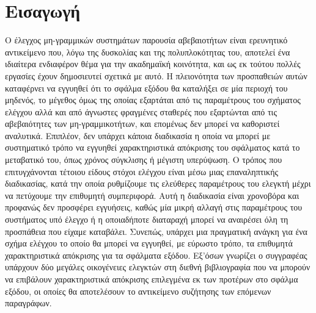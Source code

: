 \chapter{Εισαγωγή}
Ο έλεγχος μη-γραμμικών συστημάτων παρουσία αβεβαιοτήτων είναι ερευνητικό αντικείμενο που, λόγω της δυσκολίας και της πολυπλοκότητας του, αποτελεί ένα ιδιαίτερα ενδιαφέρον θέμα για την ακαδημαϊκή κοινότητα, και ως εκ τούτου πολλές εργασίες έχουν δημοσιευτεί σχετικά με αυτό. H πλειονότητα των προσπαθειών αυτών καταφέρνει να εγγυηθεί ότι το σφάλμα εξόδου θα καταλήξει σε μία περιοχή του μηδενός, το μέγεθος όμως της οποίας εξαρτάται από τις παραμέτρους του σχήματος ελέγχου αλλά και από άγνωστες φραγμένες σταθερές που εξαρτώνται από τις αβεβαιότητες των μη-γραμμικοτήτων, και επομένως δεν μπορεί να καθοριστεί αναλυτικά. Επιπλέον, δεν υπάρχει κάποια διαδικασία η οποία να μπορεί με συστηματικό τρόπο να εγγυηθεί χαρακτηριστικά απόκρισης του σφάλματος κατά το μεταβατικό του, όπως χρόνος σύγκλισης ή μέγιστη υπερύψωση. Ο τρόπος που επιτυγχάνονται τέτοιου είδους στόχοι ελέγχου είναι μέσω μιας επαναληπτικής διαδικασίας, κατά την οποία ρυθμίζουμε τις ελεύθερες παραμέτρους του ελεγκτή μέχρι να πετύχουμε την επιθυμητή συμπεριφορά. Αυτή η διαδικασία είναι χρονοβόρα και προφανώς δεν προσφέρει εγγυήσεις, καθώς μία μικρή αλλαγή στις παραμέτρους του συστήματος υπό έλεγχο ή η οποιαδήποτε διαταραχή μπορεί να αναιρέσει όλη τη προσπάθεια που είχαμε καταβάλει. Συνεπώς, υπάρχει μια πραγματική ανάγκη για ένα σχήμα ελέγχου το οποίο θα μπορεί να εγγυηθεί, με εύρωστο τρόπο, τα επιθυμητά χαρακτηριστικά απόκρισης για τα σφάλματα εξόδου. Εξ'όσων γνωρίζει ο συγγραφέας υπάρχουν δύο μεγάλες οικογένειες ελεγκτών στη διεθνή βιβλιογραφία που να μπορούν να επιβάλουν χαρακτηριστικά απόκρισης επιλεγμένα εκ των προτέρων στο σφάλμα εξόδου, οι οποίες θα αποτελέσουν το αντικείμενο συζήτησης των επόμενων παραγράφων.

